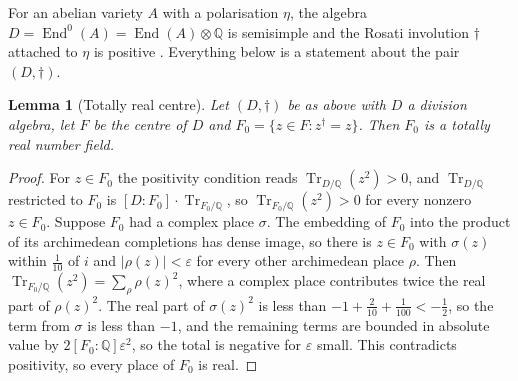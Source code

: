 \documentclass[11pt,reqno]{amsart}
\theoremstyle{plain}
\newtheorem{lemma}[theorem]{Lemma}
\theoremstyle{definition}
\theoremstyle{remark}
\newcommand{\QQ}{\mathbb{Q}}
\DeclareMathOperator{\End}{End}
\DeclareMathOperator{\Tr}{Tr}
\begin{document}
For an abelian variety $A$ with a polarisation $\eta$, the algebra
$D=\End^{0}(A)=\End(A)\otimes\QQ$ is semisimple and the Rosati involution
$\dagger$ attached to $\eta$ is positive \cite[Ch.~5]{BL04}. Everything below
is a statement about the pair $(D,\dagger)$.

\begin{lemma}[Totally real centre]\label{lem:totallyreal}
Let $(D,\dagger)$ be as above with $D$ a division algebra, let $F$ be the
centre of $D$ and $F_{0}=\{z\in F:z^{\dagger}=z\}$. Then $F_{0}$ is a totally
real number field.
\end{lemma}

\begin{proof}
For $z\in F_{0}$ the positivity condition reads
$\Tr_{D/\QQ}(z^{2})>0$, and $\Tr_{D/\QQ}$ restricted to $F_{0}$ is
$[D:F_{0}]\cdot\Tr_{F_{0}/\QQ}$, so $\Tr_{F_{0}/\QQ}(z^{2})>0$ for every
nonzero $z\in F_{0}$. Suppose $F_{0}$ had a complex place $\sigma$. The
embedding of $F_{0}$ into the product of its archimedean completions has dense
image, so there is $z\in F_{0}$ with $\sigma(z)$ within $\tfrac1{10}$ of $i$
and $|\rho(z)|<\varepsilon$ for every other archimedean place $\rho$. Then
$\Tr_{F_{0}/\QQ}(z^{2})=\sum_{\rho}\rho(z)^{2}$, where a complex place
contributes twice the real part of $\rho(z)^{2}$. The real part of
$\sigma(z)^{2}$ is less than $-1+\tfrac{2}{10}+\tfrac{1}{100}<-\tfrac12$, so
the term from $\sigma$ is less than $-1$, and the remaining terms are
bounded in absolute value by $2[F_{0}:\QQ]\varepsilon^{2}$, so the total is
negative for $\varepsilon$ small. This contradicts positivity, so every place
of $F_{0}$ is real.
\end{proof}
\end{document}
